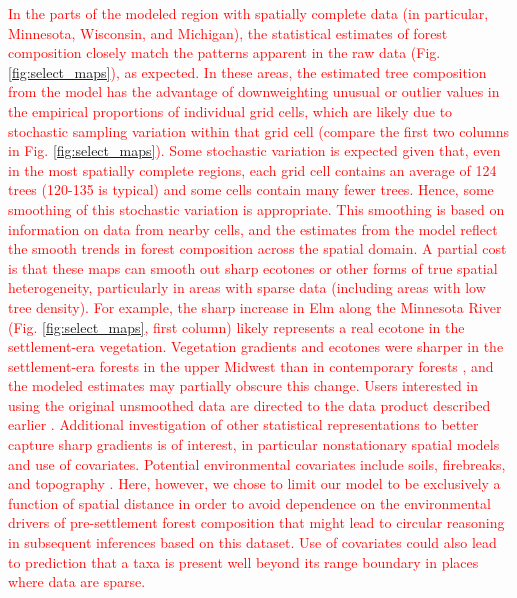 \documentclass[10pt,letterpaper]{article}
\begin{document}
\textcolor{red}{In the parts of the modeled region with spatially
complete data (in particular, Minnesota, Wisconsin, and Michigan),
the statistical estimates of forest composition closely match the
patterns apparent in the raw data (Fig. \ref{fig:select_maps}), as
expected. In these areas, the estimated tree composition from the
model has the advantage of downweighting unusual or outlier values
in the empirical proportions of individual grid cells, which are likely
due to stochastic sampling variation within that grid cell (compare
the first two columns in Fig. \ref{fig:select_maps}). Some stochastic
variation is expected given that, even in the most spatially complete
regions, each grid cell contains an average of 124 trees (120-135
is typical) \cite{goring2015composition} and some cells contain
many fewer trees. Hence, some smoothing of this stochastic variation
is appropriate. This smoothing is based on information on data from
nearby cells, and the estimates from the model reflect the smooth
trends in forest composition across the spatial domain. A partial
cost is that these maps can smooth out sharp ecotones or other forms
of true spatial heterogeneity, particularly in areas with sparse data
(including areas with low tree density). For example, the sharp increase
in Elm along the Minnesota River (Fig. \ref{fig:select_maps}, first
column) likely represents a real ecotone in the settlement-era vegetation.
Vegetation gradients and ecotones were sharper in the settlement-era
forests in the upper Midwest than in contemporary forests \cite{goring2015composition},
and the modeled estimates may partially obscure this change. Users
interested in using the original unsmoothed data are directed to the
data product described earlier \cite{Gori:etal:data:2016}. Additional
investigation of other statistical representations to better capture
sharp gradients is of interest, in particular nonstationary spatial
models and use of covariates. Potential environmental covariates include
soils, firebreaks, and topography \cite{grimm1984fire,shea2014reconstructing}.
Here, however, we chose to limit our model to be exclusively a function
of spatial distance in order to avoid dependence on the environmental
drivers of pre-settlement forest composition that might lead to circular
reasoning in subsequent inferences based on this dataset. Use of covariates
could also lead to prediction that a taxa is present well beyond its
range boundary in places where data are sparse.} 
\end{document}
